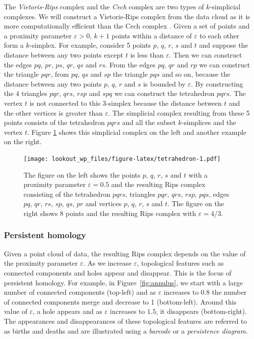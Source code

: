 \documentclass[11pt,a4paper,]{article}
\theoremstyle{definition}
\theoremstyle{definition}
\theoremstyle{definition}
\theoremstyle{remark}
\begin{document}
The \emph{Vietoris-Rips} complex and the \emph{Cech} complex are two types of \(k\)-simplicial complexes. We will construct a Vietoris-Rips complex from the data cloud as it is more computationally efficient than the Cech complex \autocite{ghrist2008barcodes}. Given a set of points and a proximity parameter \(\varepsilon > 0\), \(k+1\) points within a distance of \(\varepsilon\) to each other form a \(k\)-simplex. For example, consider 5 points \(p\), \(q\), \(r\), \(s\) and \(t\) and suppose the distance between any two points except \(t\) is less than \(\varepsilon\). Then we can construct the edges \(pq\), \(pr\), \(ps\), \(qr\), \(qs\) and \(rs\). From the edges \(pq\), \(qr\) and \(rp\) we can construct the triangle \(pqr\), from \(pq\), \(qs\) and \(sp\) the triangle \(pqs\) and so on, because the distance between any two points \(p\), \(q\), \(r\) and \(s\) is bounded by \(\varepsilon\). By constructing the \(4\) triangles \(pqr\), \(qrs\), \(rsp\) and \(spq\) we can construct the tetrahedron \(pqrs\). The vertex \(t\) is not connected to this \(3\)-simplex because the distance between \(t\) and the other vertices is greater than \(\varepsilon\). The simplicial complex resulting from these 5 points consists of the tetrahedron \(pqrs\) and all the subset \(k\)-simplices and the vertex \(t\). Figure \ref{fig:tetrahedron} shows this simplicial complex on the left and another example on the right.

\begin{figure}
\centering
\texttt{[image: lookout\_wp\_files/figure-latex/tetrahedron-1.pdf]}
\caption{\label{fig:tetrahedron}The figure on the left shows the points \(p\), \(q\), \(r\), \(s\) and \(t\) with a proximity parameter \(\varepsilon = 0.5\) and the resulting Rips complex consisting of the tetrahedron \(pqrs\), triangles \(pqr\), \(qrs\), \(rsp\), \(pqs\), edges \(pq\), \(qr\), \(rs\), \(sp\), \(qs\), \(pr\) and vertices \(p\), \(q\), \(r\), \(s\) and \(t\). The figure on the right shows \(8\) points and the resulting Rips complex with \(\varepsilon=4/3\).}
\end{figure}

\hypertarget{persistent-homology}{%
\subsubsection*{Persistent homology}\label{persistent-homology}}

Given a point cloud of data, the resulting Rips complex depends on the value of the proximity parameter \(\varepsilon\). As we increase \(\varepsilon\), topological features such as connected components and holes appear and disappear. This is the focus of persistent homology. For example, in Figure~\ref{fig:annulus}, we start with a large number of connected components (top-left) and as \(\varepsilon\) increases to \(0.8\) the number of connected components merge and decrease to 1 (bottom-left). Around this value of \(\varepsilon\), a hole appears and as \(\varepsilon\) increases to \(1.5\), it disappears (bottom-right). The appearances and disappearances of these topological features are referred to as births and deaths and are illustrated using a \emph{barcode} or a \emph{persistence diagram}.
\end{document}
